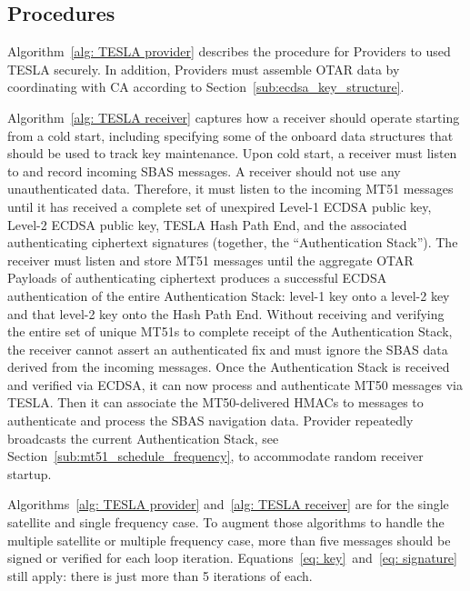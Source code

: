 \documentclass[letterpaper,times]{IONconf/IONconf}
\begin{document}
	\subsection{Procedures} \label{sub:procedures}

		Algorithm~\ref{alg: TESLA provider} describes the procedure for Providers to used TESLA securely.
		In addition, Providers must assemble OTAR data by coordinating with CA according to Section~\ref{sub:ecdsa_key_structure}.

		Algorithm~\ref{alg: TESLA receiver} captures how a receiver should operate starting from a cold start, including specifying some of the onboard data structures that should be used to track key maintenance.
		Upon cold start, a receiver must listen to and record incoming SBAS messages.
		A receiver should not use any unauthenticated data.
		Therefore, it must listen to the incoming MT51 messages until it has received a complete set of unexpired Level-1 ECDSA public key, Level-2 ECDSA public key, TESLA Hash Path End, and the associated authenticating ciphertext signatures (together, the ``Authentication Stack'').
		The receiver must listen and store MT51 messages until the aggregate OTAR Payloads of  authenticating ciphertext produces a successful ECDSA authentication of the entire Authentication Stack: level-1 key onto a level-2 key and that level-2 key onto the Hash Path End.
		Without receiving and verifying the entire set of unique MT51s to complete receipt of the Authentication Stack, the receiver cannot assert an authenticated fix and must ignore the SBAS data derived from the incoming messages.
		Once the Authentication Stack is received and verified via ECDSA, it can now process and authenticate MT50 messages via TESLA.
		Then it can associate the MT50-delivered HMACs to messages to authenticate and process the SBAS navigation data.
		Provider repeatedly broadcasts the current Authentication Stack, see Section~\ref{sub:mt51_schedule_frequency}, to accommodate random receiver startup.

		Algorithms~\ref{alg: TESLA provider} and~\ref{alg: TESLA receiver} are for the single satellite and single frequency case.
		To augment those algorithms to handle the multiple satellite or multiple frequency case, more than five messages should be signed or verified for each loop iteration.
		Equations~\eqref{eq: key}~and~\eqref{eq: signature} still apply: there is just more than 5 iterations of each.
\end{document}
